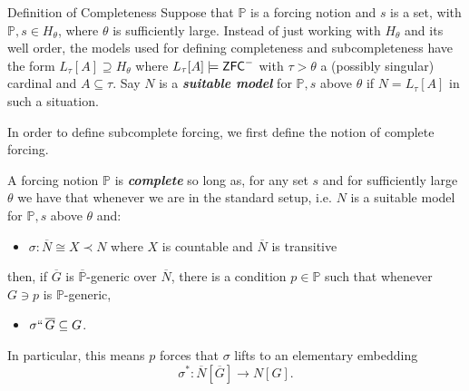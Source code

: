 \documentclass[utf8x,xcolor=svgnames,8pt]{beamer}
\renewcommand{\P}{\mathbb{P}}
\newcommand{\N}{{\overline{N}}}
\renewcommand{\G}{\overline{G}}
\newcommand{\ZFC}{\textup{\ensuremath{\textsf{ZFC}}}}
\newcommand{\To}{\longrightarrow}
\begin{document}
\begin{frame}{Definition of Completeness}
Suppose that $\P$ is a forcing notion and $s$ is a set, with $\P, s \in H_\theta$, where $\theta$ is sufficiently large. Instead of just working with $H_\theta$ and its well order, the models used for defining completeness and subcompleteness have the form $L_\tau[A] \supseteq H_\theta$ where $L_\tau[A] \models \ZFC^-$ with $\tau>\theta$ a (possibly singular) cardinal and $A \subseteq \tau$. Say $N$ is a \emph{\textbf{suitable model}} for $\P,s$ above $\theta$ if $N=L_\tau[A]$ in such a situation.

In order to define subcomplete forcing, we first define the notion of complete forcing.
\begin{definition}
A forcing notion $\P$ is \emph{\textbf{complete}} so long as, for any set $s$ and for sufficiently large $\theta$ we have that whenever we are in the standard setup, i.e. $N$ is a suitable model for $\P,s$ above $\theta$ and: \begin{itemize}
	\item $\sigma: \N \cong X \prec N$ where $X$ is countable and $\N$ is transitive
\end{itemize}
then, if $\overline G$ is $\overline{\P}$-generic over $\N$, there is a condition $p \in \P$ such that whenever $G \ni p$ is $\P$-generic, 
\begin{itemize}
	\item $\sigma ``\, \G \subseteq G$. 
\end{itemize}

In particular, this means $p$ forces that $\sigma$ lifts to an elementary embedding $$\sigma^*:\overline N[\G] \To N[G].$$
\end{definition}


\end{frame}
\end{document}

